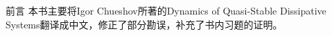 \begin{PreChapter}{前\quad 言}
	本书主要将Igor Chueshov所著的Dynamics of Quasi-Stable Dissipative Systems翻译成中文，修正了部分勘误，补充了书内习题的证明。
\end{PreChapter}
